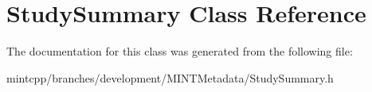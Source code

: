 \hypertarget{class_study_summary}{
\section{StudySummary Class Reference}
\label{class_study_summary}
}


The documentation for this class was generated from the following file:\begin{DoxyCompactItemize}
\item 
mintcpp/branches/development/MINTMetadata/StudySummary.h\end{DoxyCompactItemize}
